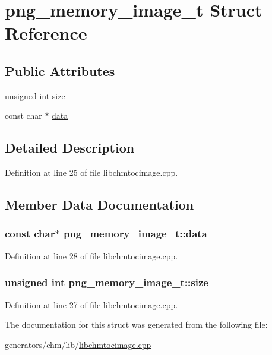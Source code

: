 \hypertarget{structpng__memory__image__t}{\section{png\+\_\+memory\+\_\+image\+\_\+t Struct Reference}
\label{structpng__memory__image__t}
}
\subsection*{Public Attributes}
\begin{DoxyCompactItemize}
\item 
unsigned int \hyperlink{structpng__memory__image__t_a3fd33d4e8209b1e66139911332c7c78f}{size}
\item 
const char $\ast$ \hyperlink{structpng__memory__image__t_aaf89dc2f8917531a87f05428ff5a1462}{data}
\end{DoxyCompactItemize}


\subsection{Detailed Description}


Definition at line 25 of file libchmtocimage.\+cpp.



\subsection{Member Data Documentation}
\hypertarget{structpng__memory__image__t_aaf89dc2f8917531a87f05428ff5a1462}{
\subsubsection[{data}]{\setlength{\rightskip}{0pt plus 5cm}const char$\ast$ png\+\_\+memory\+\_\+image\+\_\+t\+::data}}\label{structpng__memory__image__t_aaf89dc2f8917531a87f05428ff5a1462}


Definition at line 28 of file libchmtocimage.\+cpp.

\hypertarget{structpng__memory__image__t_a3fd33d4e8209b1e66139911332c7c78f}{
\subsubsection[{size}]{\setlength{\rightskip}{0pt plus 5cm}unsigned int png\+\_\+memory\+\_\+image\+\_\+t\+::size}}\label{structpng__memory__image__t_a3fd33d4e8209b1e66139911332c7c78f}


Definition at line 27 of file libchmtocimage.\+cpp.



The documentation for this struct was generated from the following file\+:\begin{DoxyCompactItemize}
\item 
generators/chm/lib/\hyperlink{libchmtocimage_8cpp}{libchmtocimage.\+cpp}\end{DoxyCompactItemize}
